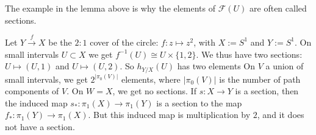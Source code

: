 The example in the lemma above is why the elements of $\mathcal{F}(U)$ are often called sections. 

\begin{exmp}
    Let $Y \xrightarrow{f} X$ be the $2:1$ cover of the circle: $f: z \mapsto z^2$, with $X := S^1$ and $Y:= S^1$. 
    On small intervals $U \subset X$ we get $f^{-1}(U)  \cong U \times \{1,2\}$. We thus have two sections: $U \mapsto (U, 1)$ and $U \mapsto (U, 2)$. So $h_{Y/X}(U)$ has two elements
    On $V$ a union of small intervals, we get $2^{|\pi_0(V)|}$ elements, where $|\pi_0(V)|$ is the number of path components of $V$. 
    On $W = X$, we get no sections. If $s: X \to Y$ is a section, then the induced map $s_*: \pi_1(X) \to \pi_1(Y)$ is a section to the map $f_*: \pi_1(Y) \to \pi_1(X)$. But this induced map is multiplication by $2$, and it does not have a section. 
\end{exmp}